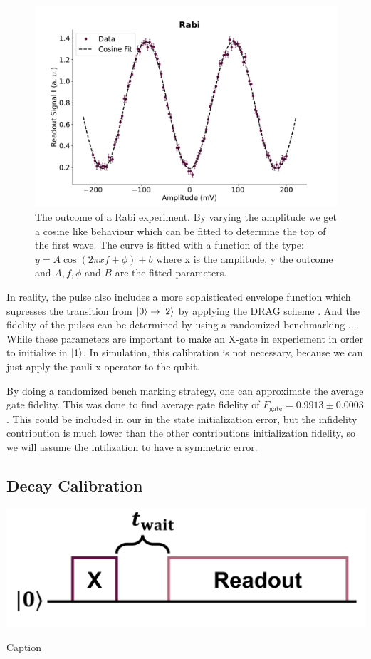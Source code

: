 \begin{figure}
    \centering
    \includegraphics{Calibrations/Figures/Rabi.pdf}
    \caption{The outcome of a Rabi experiment. By varying the amplitude we get a cosine like behaviour which can be fitted to determine the top of the first wave. The curve is fitted with a function of the type: $y = A \cos(2 \pi x f + \phi) + b$ where x is the amplitude, y the outcome and $A, f, \phi$ and $B$ are the fitted parameters.}
    \label{fig:calibration_rabi}
\end{figure}
\noindent
In reality, the pulse also includes a more sophisticated envelope function which supresses the transition from $\ket{0}\to\ket{2}$ by applying the DRAG scheme \cite{motzoi_simple_2009}. And the fidelity of the pulses can be determined by using a randomized benchmarking ...  While these parameters are important to make an X-gate in experiement in order to initialize in $\ket{1}$. In simulation, this calibration is not necessary, because we can just apply the pauli x operator to the qubit. 

By doing a randomized bench marking strategy, one can approximate the average gate fidelity. This was done to find average gate fidelity of $F_{\text{gate}} = 0.9913 \pm 0.0003$. This could be included in our in the state initialization error, but the infidelity contribution is much lower than the other contributions initialization fidelity, so we will assume the intilization to have a symmetric error.


\subsection{Decay Calibration}\label{sec:calibration_t1}
\begin{marginfigure}
    \centering
    \includegraphics[]{Figs/circuits/t1.png}
    \caption{Caption}
    \label{fig:enter-label}
\end{marginfigure}

